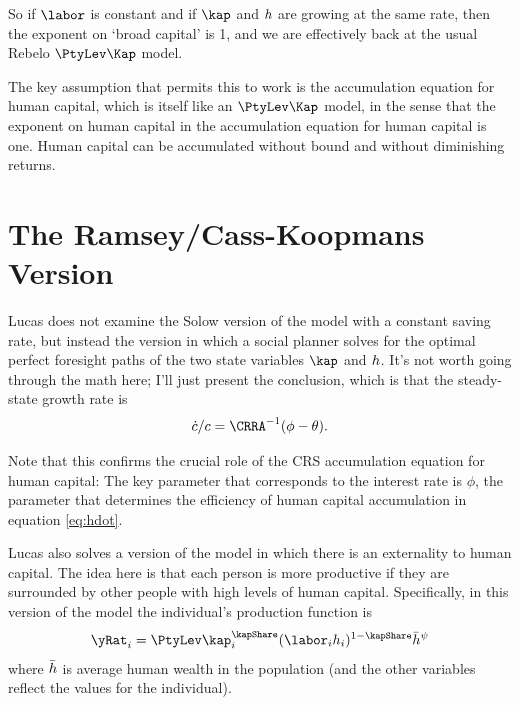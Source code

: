\documentclass{handout}
\begin{document}
So if $\labor$ is constant and if $\kap$ and $h$ are growing at the same rate,
then the exponent on `broad capital' is 1, and we are effectively back
at the usual Rebelo $\PtyLev \Kap$ model.

The key assumption that permits this to work is the accumulation
equation for human capital, which is itself like an $\PtyLev \Kap$ model, in the
sense that the exponent on human capital in the accumulation equation
for human capital is one.  Human capital can be accumulated without
bound and without diminishing returns.

\section{The Ramsey/Cass-Koopmans Version}

Lucas does not examine the Solow version of the model with a constant
saving rate, but instead the version in which a social planner solves
for the optimal perfect foresight paths of the two state variables $\kap$
and $h$.  It's not worth going through the math here; I'll just
present the conclusion, which is that the steady-state growth rate is
\begin{equation}
  \label{eq:ssg}
  \dot{c}/c = \CRRA^{-1}(\phi - \theta).
\end{equation}

Note that this confirms the crucial role of the CRS accumulation 
equation for human capital: The key parameter that corresponds to
the interest rate is $\phi$, the parameter that determines the efficiency
of human capital accumulation in equation \eqref{eq:hdot}.

Lucas also solves a version of the model in which there is an 
externality to human capital.  The idea here is that each person
is more productive if they are surrounded by other people with high
levels of human capital.  Specifically, in this version of the model
the individual's production function is 
\begin{equation}
  \label{eq:pcyext}
  \yRat_i = \PtyLev \kap_{i}^{\kapShare} (\labor _{i}\hLucas_{i})^{1-\kapShare} \bar{\hLucas}^{\psi}
\end{equation}
where $\bar{h}$ is average human wealth in the population (and the
other variables reflect the values for the individual).
\end{document}
